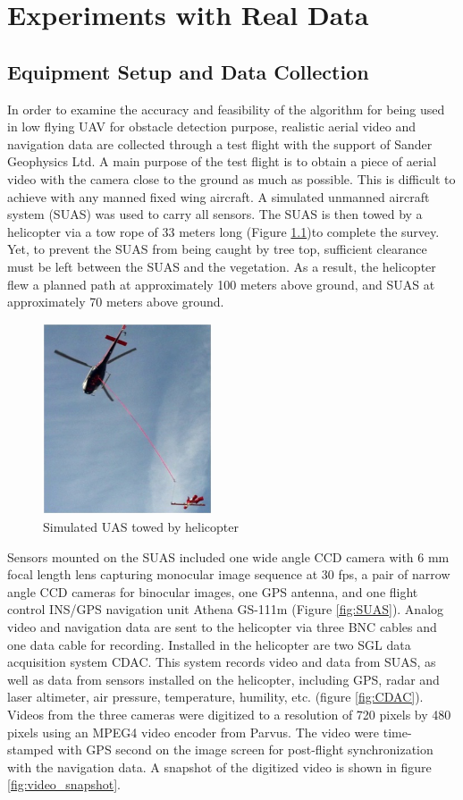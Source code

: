 \chapter{Experiments with Real Data}
\section{Equipment Setup and Data Collection}
In order to examine the accuracy and feasibility of the algorithm for
being used in low flying UAV for obstacle detection purpose, realistic
aerial video and navigation data are collected through a test flight
with the support of Sander Geophysics Ltd. A main purpose of the test
flight is to obtain a piece of aerial video with the camera close to
the ground as much as possible. This is difficult to achieve with any
manned fixed wing aircraft. A simulated unmanned aircraft system
(SUAS) was used to carry all sensors. The SUAS is then towed by a
helicopter via a tow rope of 33 meters long (Figure
\ref{fig:towedSUAS})to complete the survey. Yet, to prevent the SUAS
from being caught by tree top, sufficient clearance must be left
between the SUAS and the vegetation. As a result, the helicopter flew
a planned path at approximately 100 meters above ground, and SUAS at
approximately 70 meters above ground.

\begin{figure}[h]
\centering
\includegraphics[width=5cm,keepaspectratio=true]{./Figures/towed_SUAS.jpg}
\caption{Simulated UAS towed by helicopter}
\label{fig:towedSUAS}
\end{figure}
\FloatBarrier

Sensors mounted on the SUAS included one wide angle CCD camera with 6
mm focal length lens capturing monocular image sequence at 30 fps, a
pair of narrow angle CCD cameras for binocular images, one GPS
antenna, and one flight control INS/GPS navigation unit Athena GS-111m
\cite{_athena_????} (Figure \ref{fig:SUAS}). Analog video and
navigation data are sent to the helicopter via three BNC cables and
one data cable for recording. Installed in the helicopter are two SGL
data acquisition system CDAC. This system records video and data from
SUAS, as well as data from sensors installed on the helicopter,
including GPS, radar and laser altimeter, air pressure, temperature,
humility, etc. (figure \ref{fig:CDAC}). Videos from the three cameras
were digitized to a resolution of 720 pixels by 480 pixels using an
MPEG4 video encoder from Parvus. The video were time-stamped with GPS
second on the image screen for post-flight synchronization with the
navigation data. A snapshot of the digitized video is shown in figure
\ref{fig:video_snapshot}.

